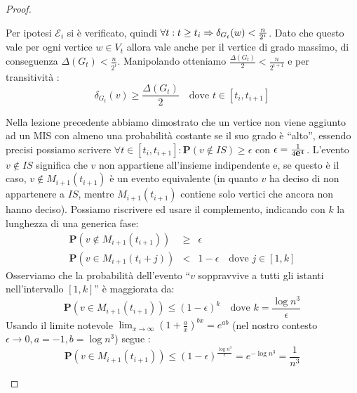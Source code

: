 \documentclass{article}
\begin{document}
\begin{proof}
\begin{itemize}
    Per ipotesi $\mathcal{E}_i$ si \`e verificato, quindi $\forall t: 
    t \geq t_i \Rightarrow \delta_{G_{t}}(w) < \frac{n}{2^i}$.
    Dato che questo vale per ogni vertice $w \in V_t$ allora vale anche 
    per il vertice di grado massimo, di conseguenza 
    $\Delta(G_{t}) < \frac{n}{2^i}$. Manipolando otteniamo
    $\frac{\Delta(G_{t})}{2} < \frac{n}{2^{i+1}}$ e per transitivit\`a :
    \begin{displaymath}
        \delta_{G_t}(v) \geq \frac{\Delta(G_{t})}{2} \quad \text{dove } 
        t \in [t_i,t_{i+1}]
    \end{displaymath}

    Nella lezione precedente abbiamo dimostrato che
    un vertice non viene aggiunto ad un MIS con almeno una probabilit\`a 
    costante se il suo grado \`e ``alto'', essendo precisi possiamo scrivere 
    $\forall t \in [t_i,t_{i+1}]: \mathbf{P}(v \not \in IS) \geq \epsilon$
    con $\epsilon ={{1} \over {4\mbox{{\bfseries e}}^{4}}}$.
    L'evento $v \not \in IS$ significa che $v$ non appartiene all'insieme
    indipendente e, se questo \`e il caso, $v \not \in M_{i+1}(t_{i+1})$ 
    \`e un evento equivalente (in quanto $v$ ha deciso 
    di non appartenere a $IS$, mentre $M_{i+1}(t_{i+1})$ contiene solo
    vertici che ancora non hanno deciso). Possiamo
    riscrivere ed usare il complemento, indicando con $k$ la lunghezza
    di una generica fase:
    \begin{displaymath}
    \begin{array} {lcl} 
        \mathbf{P}(v \not \in M_{i+1}(t_{i+1})) & \geq & \epsilon \\
        \mathbf{P}(v \in M_{i+1}(t_i + j)) & < & 1-\epsilon \quad 
            \text{dove } j\in[1,k]
    \end{array}
    \end{displaymath}
    Osserviamo che la probabilit\`a dell'evento ``$v$ soppravvive a tutti
    gli istanti nell'intervallo $[1,k]$'' \`e maggiorata da:
    \begin{displaymath}
        \mathbf{P}(v \in M_{i+1}(t_{i+1})) \leq (1 - \epsilon)^k 
            \quad \text{dove } k = \frac{\log{n}^3}{\epsilon}
    \end{displaymath}
    Usando il limite notevole $\lim_{x \rightarrow \infty}{(1 + 
    \frac{a}{x})^{bx}} = e^{ab}$ (nel nostro contesto $\epsilon \rightarrow 0
    , a = -1, b = \log{n^3}$)
    segue :
    \begin{displaymath}
        \mathbf{P}(v \in M_{i+1}(t_{i+1})) \leq (1 - \epsilon)^
        \frac{\log{n}^3}{\epsilon} = e^{-\log{n}^3} = \frac{1}{n^3}

\end{displaymath}
\end{itemize}
\end{proof}
\end{document}
